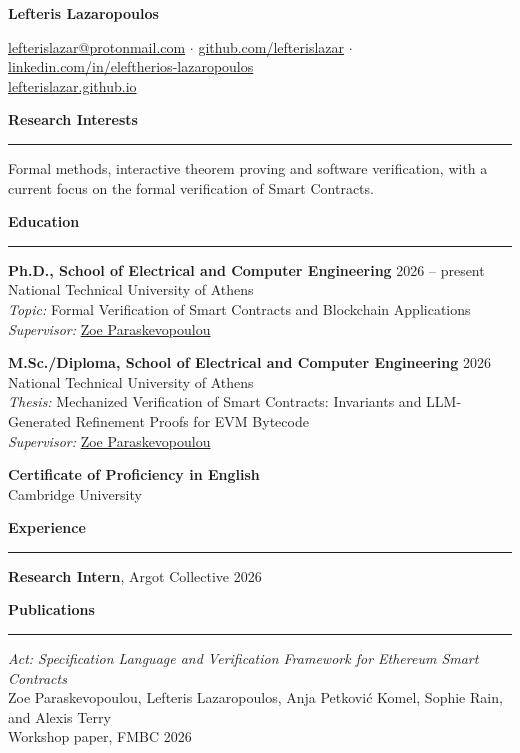 \documentclass[11pt, a4paper]{article}
\newcommand{\sectionrule}[1]{%
  \vspace{0.8em}
  {\large\textbf{#1}}\\[-0.5em]
  \rule{\linewidth}{0.4pt}
  \vspace{0.2em}
}
\begin{document}
{\LARGE \textbf{Lefteris Lazaropoulos}}

\vspace{0.3em}

\href{mailto:lefterislazar@protonmail.com}{lefterislazar@protonmail.com} $\cdot$
\href{https://github.com/lefterislazar}{github.com/lefterislazar} $\cdot$
\href{https://www.linkedin.com/in/eleftherios-lazaropoulos}{linkedin.com/in/eleftherios-lazaropoulos} \\
\href{https://lefterislazar.github.io}{lefterislazar.github.io}

\sectionrule{Research Interests}

Formal methods, interactive theorem proving and software verification, with a current focus on the formal verification of Smart Contracts.

\sectionrule{Education}

\textbf{Ph.D., School of Electrical and Computer Engineering} \hfill 2026 -- present \\
National Technical University of Athens \\
\textit{Topic:} Formal Verification of Smart Contracts and Blockchain Applications \\
\textit{Supervisor:} \href{https://zoep.github.io/}{Zoe Paraskevopoulou}

\vspace{0.5em}

\textbf{M.Sc./Diploma, School of Electrical and Computer Engineering} \hfill 2026 \\
National Technical University of Athens \\
\textit{Thesis:} Mechanized Verification of Smart Contracts: Invariants and LLM-Generated Refinement Proofs for EVM Bytecode \\
\textit{Supervisor:} \href{https://zoep.github.io/}{Zoe Paraskevopoulou}

\vspace{0.5em}

\textbf{Certificate of Proficiency in English} \\
Cambridge University

\sectionrule{Experience}

\textbf{Research Intern}, Argot Collective \hfill 2026

\sectionrule{Publications}

\textit{Act: Specification Language and Verification Framework for Ethereum Smart Contracts} \\
Zoe Paraskevopoulou, Lefteris Lazaropoulos, Anja Petković Komel, Sophie Rain, and Alexis Terry \\
{\small Workshop paper, FMBC 2026}
\end{document}
